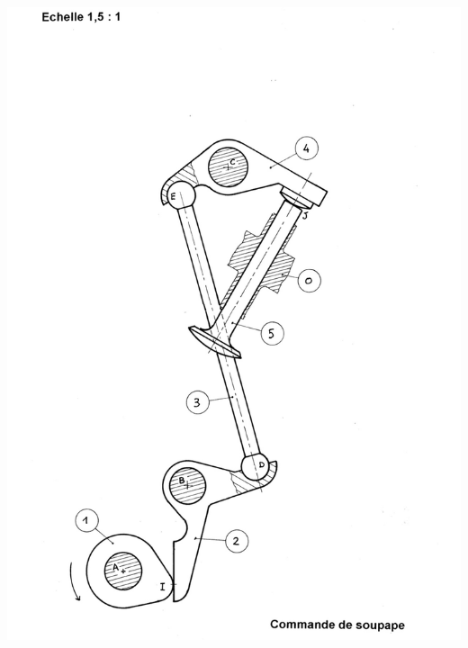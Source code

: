 \documentclass[10pt,fleqn]{article} %
\begin{document}
\newpage
\begin{center}
\includegraphics[width=\textwidth]{images/soupape_A3}
\end{center}
\end{document}
